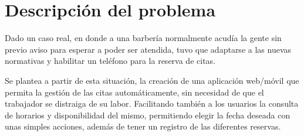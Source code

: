 \chapter{Descripción del problema}

Dado un caso real, en donde a una barbería normalmente acudía la gente sin previo aviso para esperar a
poder ser atendida, tuvo que adaptarse a las nuevas normativas y habilitar un teléfono para la reserva de citas.

Se plantea a partir de esta situación, la creación de una aplicación web/móvil que permita la gestión de las citas
automáticamente, sin necesidad de que el trabajador se distraiga de su labor. Facilitando también a los usuarios la
consulta de horarios y disponibilidad del mismo, permitiendo elegir la fecha deseada con unas simples acciones,
además de tener un registro de las diferentes reservas.